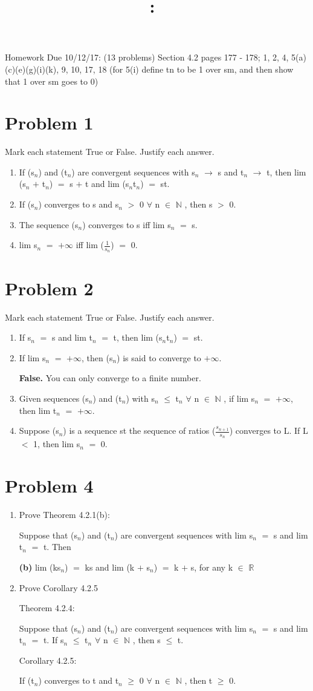 \documentclass{article}
\title{
    \vspace{2in}
    \textmd{\textbf{\hmwkClass:\ \hmwkTitle}}\\
    \normalsize\vspace{0.1in}\small\vspace{0.1in}\large{\textit{\hmwkClassInstructor}}
    \vspace{3in}
}
\author{\hmwkAuthorName}
\date{}
\newcommand{\mt}[1]{\ensuremath{#1}}
\newcommand\bsc[2][\DefaultOpt]{%
  \def\DefaultOpt{#2}%
  \section[#1]{#2}%
}
\newcommand{\balist}{\begin{enumerate}[label=\alph*.]}
\newcommand{\elist}{\end{enumerate}}
\newcommand{\bpth}[1]{\textbf{(#1)}}
\newcommand{\br}{\mt{\mathbb{R}} }       %
\newcommand{\bn}{\mt{\mathbb{N}} }       %
\newcommand{\fa}{\mt{\forall} }          %
\newcommand{\mem}{\mt{\in} }
\newcommand{\lra}{ \mt{\longrightarrow} } %
\newcommand{\prn}[1]{(#1)}
\newcommand{\ps}{\mt{+} }
\newcommand{\ls}{\mt{<} }
\newcommand{\gr}{\mt{>} }
\newcommand{\lse}{\mt{\leq} }
\newcommand{\gre}{\mt{\geq} }
\newcommand{\eql}{\mt{=} }
\newcommand{\uw}[2]{#1\mt{_{#2}}}
\newcommand{\frc}[2]{\mt{\frac{#1}{#2}}}
\begin{document}
Homework Due 10/12/17: (13 problems) Section 4.2 pages 177 - 178; 1, 2, 4, 5(a)(c)(e)(g)(i)(k), 9, 10, 17, 18 (for 5(i) define tn to be 1 over sm, and then show that 1 over sm goes to 0)

\bsc{Problem 1}{
Mark each statement True or False. Justify each answer.

\balist
\item If \prn{\uw{s}{n}} and (\uw{t}{n}) are convergent sequences with \uw{s}{n} \lra s and \uw{t}{n} \lra t, then lim (\uw{s}{n} \ps \uw{t}{n}) \eql s \ps t and lim (\uw{s}{n}\uw{t}{n}) \eql st.
\item If \prn{\uw{s}{n}} converges to s and \uw{s}{n} \gr 0 \fa n \mem \bn, then s \gr 0.
\item The sequence \prn{\uw{s}{n}} converges to s iff lim \uw{s}{n} \eql s.
\item lim \uw{s}{n} \eql $+\infty$ iff lim (\frc{1}{\uw{s}{n}}) \eql 0.
\elist
}

\bsc{Problem 2}{
Mark each statement True or False. Justify each answer.

\balist
\item If \uw{s}{n} \eql s and lim \uw{t}{n} \eql t, then lim (\uw{s}{n}\uw{t}{n}) \eql st.
\item If lim \uw{s}{n} \eql $+\infty$, then \prn{\uw{s}{n}} is said to converge to $+\infty$.
	
	\textbf{False.} You can only converge to a finite number.
\item Given sequences \prn{\uw{s}{n}} and \prn{\uw{t}{n}} with \uw{s}{n} \lse \uw{t}{n} \fa n \mem \bn, if lim \uw{s}{n} \eql $+\infty$, then lim \uw{t}{n} \eql $+\infty$.
\item Suppose \prn{\uw{s}{n}} is a sequence st the sequence of ratios (\frc{\uw{s}{n \ps 1}}{\uw{s}{n}}) converges to L. If L \ls 1, then lim \uw{s}{n} \eql 0.
\elist
}

\bsc{Problem 4}{
\balist
\item Prove Theorem 4.2.1(b):
	
	Suppose that \prn{\uw{s}{n}} and (\uw{t}{n}) are convergent sequences with lim \uw{s}{n} \eql s and lim \uw{t}{n} \eql t. Then
	
	\bpth{b} lim (k\uw{s}{n}) \eql ks and lim (k \ps \uw{s}{n}) \eql k \ps s, for any k \mem \br
	
	
\item Prove Corollary 4.2.5
	
	Theorem 4.2.4:
	
	Suppose that (\uw{s}{n}) and (\uw{t}{n}) are convergent sequences with lim \uw{s}{n} \eql s and lim \uw{t}{n} \eql t. If \uw{s}{n} \lse \uw{t}{n} \fa n \mem \bn, then s \lse t.
	
	Corollary 4.2.5:
	
	If \prn{\uw{t}{n}} converges to t and \uw{t}{n} \gre 0 \fa n \mem \bn, then t \gre 0.
\elist
}
\end{document}

